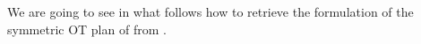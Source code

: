 



We are going to see in what follows how to retrieve the formulation of the symmetric OT plan of  from .

